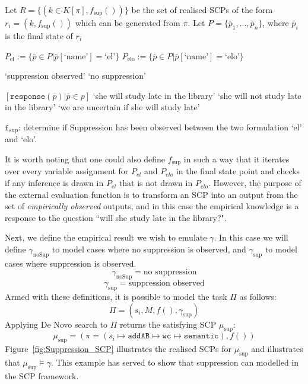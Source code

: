 \begin{algorithm}[H] 
\SetAlgoLined
{}
{
Let $R=\{(k\in K[\pi],f_\text{sup}())\}$ be the set of realised SCPs of the form $r_i=(k,f_\text{sup}())$ which can be generated from $\pi$.\;
Let $P=\{\bar{p}_1,...,\bar{p}_n\}$, where $\bar{p}_i$ is the final state of $r_i$\;

$P_\text{el}:=\{\bar{p} \in P | \bar{p}[\text{`name'}]=\text{`el'}\}$\;
$P_\text{elo}:=\{\bar{p} \in P | \bar{p}[\text{`name'}]=\text{`elo'}\}$\;

{
\Return  `suppression observed'
}
\Else
{
\Return  `no suppression'
}
}
{
\Return $[\texttt{response}(\bar{p}) | \bar{p} \in p]$
}
{
{
\Return `she will study late in the library'
}
{
\Return `she will not study late in the library'
}
\Else
{
\Return `we are uncertain if she will study late'
}
}

\caption{$\texttt{f}_\text{sup}$: determine if Suppression has been observed between the two formulation `el' and `elo'.}
\label{evaluation:f_sup}
\end{algorithm}

It is worth noting that one could also define $f_\text{sup}$ in such a way that it iterates over every variable assignment for $P_{el}$ and $P_{elo}$ in the final state point and checks if any inference is drawn in $P_{el}$ that is not drawn in $P_{elo}$. However, the purpose of the external evaluation function is to transform an SCP into an output from the set of \textit{empirically observed} outputs, and in this case the empirical knowledge is a response to the question ``will she study late in the library?".

Next, we define the empirical result we wish to emulate $\gamma$. In this case we will define $\gamma_\text{noSup}$ to model cases where no suppression is observed, and $\gamma_{\text{sup}}$ to model cases where suppression is observed.
\[\gamma_{\text{noSup}} = \text{no suppression} \]
\[\gamma_{\text{sup}} = \text{suppression observed} \]
Armed with these definitions, it is possible to model the task $\Pi$ as follows:
\[\Pi=(s_i,M,f(),\gamma_{\text{sup}})\]
Applying De Novo search to $\Pi$ returns the satisfying SCP $\mu_\text{sup}$:
\[\mu_\text{sup}=(\pi=(s_i \longmapsto \texttt{addAB} \longmapsto \texttt{wc} \longmapsto \texttt{semantic}),f())\]
Figure~\ref{fig:Suppression_SCP} illustrates the realised SCPs for $\mu_\text{sup}$ and illustrates that $\mu_\text{sup} \models \gamma$. This example has served to show that suppression can modelled in the SCP framework.

